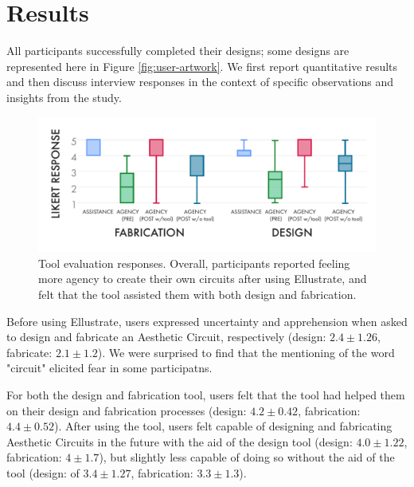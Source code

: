 \documentclass{sigchi}
\begin{document}
\section{Results}
All participants successfully completed their designs; some designs are represented here in Figure \ref{fig:user-artwork}. 
We first report quantitative results and then discuss interview responses in the context of specific observations and insights from the study.

\begin{figure}[t]
\centering
\includegraphics[width=1.0\columnwidth]{charts/boxplots_quant.pdf}
\caption{Tool evaluation responses. Overall, participants reported feeling more agency to create their own circuits after using Ellustrate, and felt that the tool assisted them with both design and fabrication.}
\label{fig:fab_tool_results}
\vspace{-20pt}
\end{figure}

Before using Ellustrate, users expressed uncertainty and apprehension when asked to design and fabricate an Aesthetic Circuit, respectively (design:  $2.4 \pm 1.26$, fabricate:  $2.1 \pm 1.2$). We were surprised to find that the mentioning of the word "circuit" elicited fear in some participatns. 

For both the design and fabrication tool, users felt that the tool had helped them on their design and fabrication processes (design:  $4.2 \pm 0.42$, fabrication:  $4.4 \pm 0.52$). After using the tool, users felt capable of designing and fabricating Aesthetic Circuits in the future with the aid of the design tool (design:  $4.0 \pm 1.22$, fabrication:  $4 \pm 1.7$), but slightly less capable of doing so without the aid of the tool (design:  of $3.4 \pm 1.27$, fabrication:  $3.3 \pm 1.3$). 
  
\end{document}
